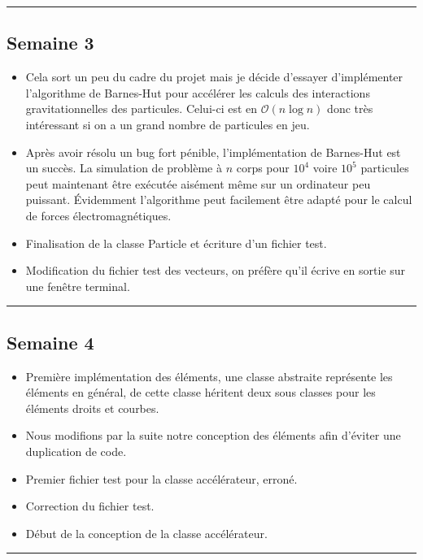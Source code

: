 \documentclass[12pt, letterpaper, twoside]{article}
\begin{document}
\rule{\textwidth}{0.4pt}

\subsection*{Semaine 3}
\begin{itemize}
\item Cela sort un peu du cadre du projet mais je décide d'essayer d'implémenter l'algorithme de Barnes-Hut pour accélérer les calculs des interactions gravitationnelles des particules. Celui-ci est en  $\mathcal{O}(n\log{n})$ donc très intéressant si on a un grand nombre de particules en jeu.

\item Après avoir résolu un bug fort pénible, l'implémentation de Barnes-Hut est un succès. La simulation de problème à $n$ corps pour $10^4$ voire $10^5$ particules peut maintenant être exécutée aisément même sur un ordinateur peu puissant. Évidemment l'algorithme peut facilement être adapté pour le calcul de forces électromagnétiques.

\item Finalisation de la classe Particle et écriture d'un fichier test.
\item Modification du fichier test des vecteurs, on préfère qu'il écrive en sortie sur une fenêtre terminal.
\end{itemize}

\rule{\textwidth}{0.4pt}

\subsection*{Semaine 4}

\begin{itemize}
\item Première implémentation des éléments, une classe abstraite représente les éléments en général, de cette classe héritent deux sous classes pour les éléments droits et courbes.
\item Nous modifions par la suite notre conception des éléments afin d'éviter une duplication de code.
\item Premier fichier test pour la classe accélérateur, erroné.
\item Correction du fichier test.
\item Début de la conception de la classe accélérateur.
\end{itemize}

\rule{\textwidth}{0.4pt}
\end{document}

